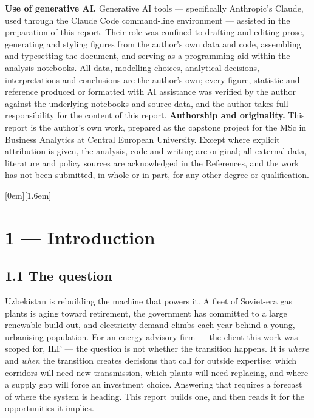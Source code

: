 \documentclass[10pt,twocolumn]{article}
\begin{document}
\textbf{Use of generative AI.} Generative AI tools --- specifically Anthropic's Claude, used through the Claude Code command-line environment --- assisted in the preparation of this report. Their role was confined to drafting and editing prose, generating and styling figures from the author's own data and code, assembling and typesetting the document, and serving as a programming aid within the analysis notebooks. All data, modelling choices, analytical decisions, interpretations and conclusions are the author's own; every figure, statistic and reference produced or formatted with AI assistance was verified by the author against the underlying notebooks and source data, and the author takes full responsibility for the content of this report.
\textbf{Authorship and originality.} This report is the author's own work, prepared as the capstone project for the MSc in Business Analytics at Central European University. Except where explicit attribution is given, the analysis, code and writing are original; all external data, literature and policy sources are acknowledged in the References, and the work has not been submitted, in whole or in part, for any other degree or qualification.
{\small\setlength{\parskip}{1.5pt}\renewcommand{\baselinestretch}{0.98}[0em]{\smallskip}{}{}{\contentspage}[1.6em]{}{}{}{\contentspage}\tableofcontents}
\clearpage\pagestyle{fancy}\twocolumn


\section*{1 --- Introduction}

\subsection*{1.1 The question}

Uzbekistan is rebuilding the machine that powers it. A fleet of Soviet-era gas plants is aging toward retirement, the government has committed to a large renewable build-out, and electricity demand climbs each year behind a young, urbanising population. For an energy-advisory firm --- the client this work was scoped for, ILF --- the question is not whether the transition happens. It is \textit{where} and \textit{when} the transition creates decisions that call for outside expertise: which corridors will need new transmission, which plants will need replacing, and where a supply gap will force an investment choice. Answering that requires a forecast of where the system is heading. This report builds one, and then reads it for the opportunities it implies.
\end{document}
